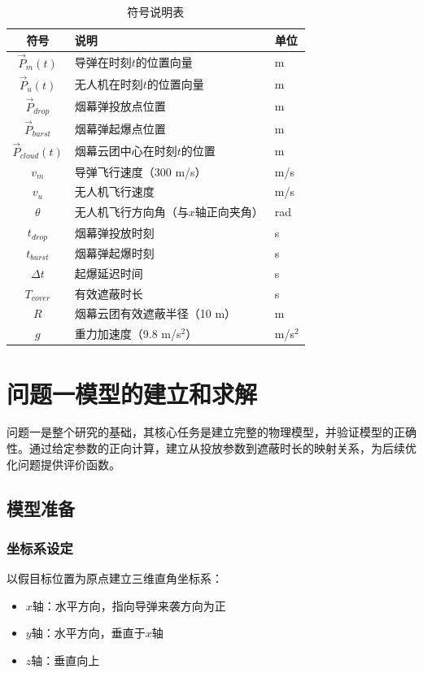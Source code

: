\documentclass[12pt,a4paper]{article}
\begin{document}
\begin{table}[H]
\centering
\caption{符号说明表}
\label{tab:symbols}
\begin{tabular}{cll}
\toprule
符号 & 说明 & 单位 \\
\midrule
$\vec{P}_m(t)$ & 导弹在时刻$t$的位置向量 & m \\
$\vec{P}_u(t)$ & 无人机在时刻$t$的位置向量 & m \\
$\vec{P}_{drop}$ & 烟幕弹投放点位置 & m \\
$\vec{P}_{burst}$ & 烟幕弹起爆点位置 & m \\
$\vec{P}_{cloud}(t)$ & 烟幕云团中心在时刻$t$的位置 & m \\
$v_m$ & 导弹飞行速度（300 m/s） & m/s \\
$v_u$ & 无人机飞行速度 & m/s \\
$\theta$ & 无人机飞行方向角（与$x$轴正向夹角） & rad \\
$t_{drop}$ & 烟幕弹投放时刻 & s \\
$t_{burst}$ & 烟幕弹起爆时刻 & s \\
$\Delta t$ & 起爆延迟时间 & s \\
$T_{cover}$ & 有效遮蔽时长 & s \\
$R$ & 烟幕云团有效遮蔽半径（10 m） & m \\
$g$ & 重力加速度（9.8 m/s$^2$） & m/s$^2$ \\
\bottomrule
\end{tabular}
\end{table}

\section{问题一模型的建立和求解}

问题一是整个研究的基础，其核心任务是建立完整的物理模型，并验证模型的正确性。通过给定参数的正向计算，建立从投放参数到遮蔽时长的映射关系，为后续优化问题提供评价函数。

\subsection{模型准备}

\subsubsection{坐标系设定}
以假目标位置为原点建立三维直角坐标系：
\begin{itemize}
    \item $x$轴：水平方向，指向导弹来袭方向为正
    \item $y$轴：水平方向，垂直于$x$轴
    \item $z$轴：垂直向上
\end{itemize}
\end{document}
